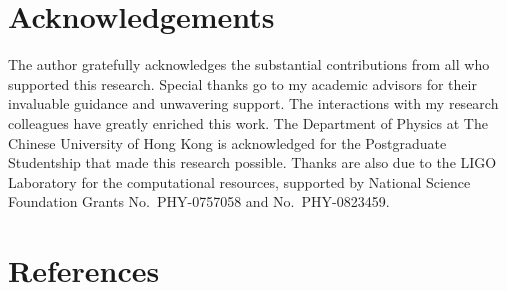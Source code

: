 \documentclass[10pt,a4paper,onecolumn]{article}
\begin{document}
\section{Acknowledgements}\label{acknowledgements}

The author gratefully acknowledges the substantial contributions from
all who supported this research. Special thanks go to my academic
advisors for their invaluable guidance and unwavering support. The
interactions with my research colleagues have greatly enriched this
work. The Department of Physics at The Chinese University of Hong Kong
is acknowledged for the Postgraduate Studentship that made this research
possible. Thanks are also due to the LIGO Laboratory for the
computational resources, supported by National Science Foundation Grants
No.~PHY-0757058 and No.~PHY-0823459.

\section{References}\label{references}
\end{document}
